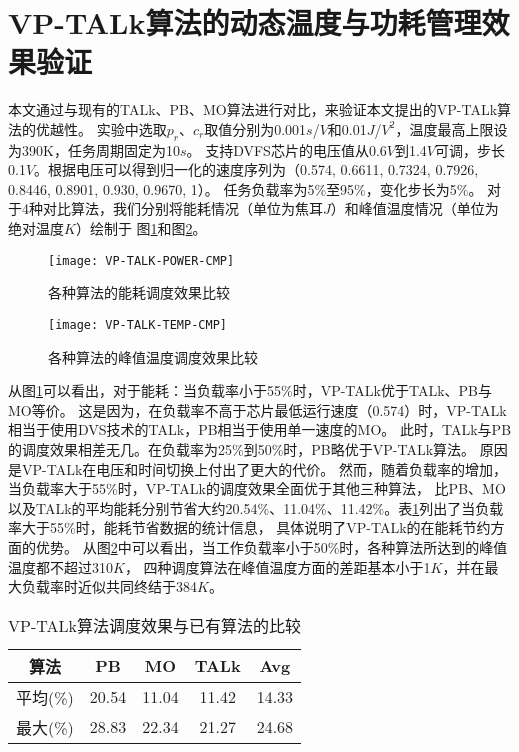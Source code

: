 \section{VP-TALk算法的动态温度与功耗管理效果验证}
本文通过与现有的TALk、PB、MO算法进行对比，来验证本文提出的VP-TALk算法的优越性。 实验中选取$p_r$、$c_r$取值分别为0.001$s$/$V$和0.01$J$/$V^2$，温度最高上限设为390K，任务周期固定为10$s$。 支持DVFS芯片的电压值从0.6$V$到1.4$V$可调，步长0.1$V$。根据电压可以得到归一化的速度序列为（0.574, 0.6611, 0.7324, 0.7926, 0.8446, 0.8901, 0.930, 0.9670, 1）。 任务负载率为5\%至95\%，变化步长为5\%。 对于4种对比算法，我们分别将能耗情况（单位为焦耳$J$）和峰值温度情况（单位为绝对温度$K$）绘制于 图\ref{fig:vp-talk-power-cmp}和图\ref{fig:vp-talk-temp-cmp}。
\begin{figure}[H]
  \centering
  \texttt{[image: VP-TALK-POWER-CMP]}
  \caption{各种算法的能耗调度效果比较}
  \label{fig:vp-talk-power-cmp}
\end{figure}
\begin{figure}[H]
  \centering
  \texttt{[image: VP-TALK-TEMP-CMP]}
  \caption{各种算法的峰值温度调度效果比较}
  \label{fig:vp-talk-temp-cmp}
\end{figure}
从图\ref{fig:vp-talk-power-cmp}可以看出，对于能耗：当负载率小于55\%时，VP-TALk优于TALk、PB与MO等价。 这是因为，在负载率不高于芯片最低运行速度（0.574）时，VP-TALk相当于使用DVS技术的TALk，PB相当于使用单一速度的MO。 此时，TALk与PB的调度效果相差无几。在负载率为25\%到50\%时，PB略优于VP-TALk算法。 原因是VP-TALk在电压和时间切换上付出了更大的代价。 然而，随着负载率的增加，当负载率大于55\%时，VP-TALk的调度效果全面优于其他三种算法， 比PB、MO以及TALk的平均能耗分别节省大约20.54\%、11.04\%、11.42\%。表\ref{tab:chap3:vp-talk-cmp}列出了当负载率大于55\%时，能耗节省数据的统计信息， 具体说明了VP-TALk的在能耗节约方面的优势。
从图\ref{fig:vp-talk-temp-cmp}中可以看出，当工作负载率小于50\%时，各种算法所达到的峰值温度都不超过310$K$， 四种调度算法在峰值温度方面的差距基本小于1$K$，并在最大负载率时近似共同终结于384$K$。
\begin{table}
\centering
\caption{VP-TALk算法调度效果与已有算法的比较}
\begin{tabular}{c c c c c}
\hline\hline
算法 & PB & MO & TALk & Avg \\ [0.5ex]
\hline
平均(\%) & 20.54 & 11.04 & 11.42 & 14.33 \\
最大(\%) & 28.83 & 22.34 & 21.27 & 24.68 \\
\hline
\end{tabular}
\label{tab:chap3:vp-talk-cmp}
\end{table}

